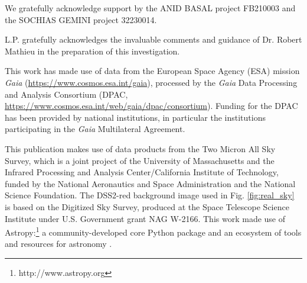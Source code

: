 \documentclass{aa}
\begin{document}
\begin{acknowledgements}
We gratefully acknowledge support by the ANID BASAL project FB210003 and the SOCHIAS GEMINI project 32230014.

L.P. gratefully acknowledges the invaluable comments and guidance of Dr. Robert Mathieu in the preparation of this investigation.

This work has made use of data from the European Space Agency (ESA) mission {\it Gaia} (\url{https://www.cosmos.esa.int/gaia}), processed by the {\it Gaia} Data Processing and Analysis Consortium (DPAC, \url{https://www.cosmos.esa.int/web/gaia/dpac/consortium}). Funding for the DPAC has been provided by national institutions, in particular the institutions participating in the {\it Gaia} Multilateral Agreement. 

This publication makes use of data products from the Two Micron All Sky Survey, which is a joint project of the University of Massachusetts and the Infrared Processing and Analysis Center/California Institute of Technology, funded by the National Aeronautics and Space Administration and the National Science Foundation. The DSS2-red background image used in Fig. \ref{fig:real_sky} is based on the Digitized Sky Survey, produced at the Space Telescope Science Institute under U.S. Government grant NAG W-2166. This work made use of Astropy:\footnote{http://www.astropy.org} a community-developed core Python package and an ecosystem of tools and resources for astronomy \citep{astropy:2013, astropy:2018, astropy:2022}.
\end{acknowledgements}


 
\end{document}

